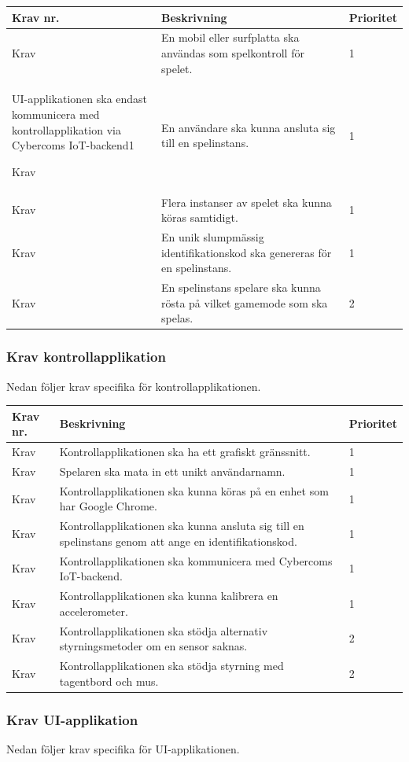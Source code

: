 \documentclass[10pt]{article}
\newcounter{indexcounter}
\newcommand{\Krav}[2]{
	\stepcounter{indexcounter}
	Krav \arabic{indexcounter} & #1 & #2 \\ \hline
}
\begin{document}
	\begin{tabular}{| p{2cm} | p{8cm} | p{2cm}|}
		\hline
		
		\textbf{Krav nr.} & \textbf{Beskrivning} &\textbf{Prioritet} \\ \hline
		\Krav{En mobil eller surfplatta ska användas som spelkontroll för spelet.}{1}
		\Krav{UI-applikationen ska endast kommunicera med \newline kontrollapplikation via  Cybercoms IoT-backend}{1}
		\Krav{En användare ska kunna ansluta sig till en spelinstans.}{1}
		\Krav{Flera instanser av spelet ska kunna köras samtidigt.}{1}
		\Krav{En unik slumpmässig identifikationskod ska genereras för en spelinstans.}{1}
		\Krav{En spelinstans spelare ska kunna rösta på vilket gamemode som ska spelas.}{2}
				
	\end{tabular}

	\subsubsection*{Krav kontrollapplikation}
	Nedan följer krav specifika för kontrollapplikationen.

	\begin{tabular}{| p{2cm} | p{8cm} | p{2cm}|}
		\hline
		
		\textbf{Krav nr.} & \textbf{Beskrivning} &\textbf{Prioritet} \\ \hline
		\Krav{Kontrollapplikationen ska ha ett grafiskt gränssnitt.}{1}
		\Krav{Spelaren ska mata in ett unikt användarnamn.}{1}
		\Krav{Kontrollapplikationen ska kunna köras på en enhet som har Google Chrome.}{1}
		\Krav{Kontrollapplikationen ska kunna ansluta sig till en spelinstans genom att ange en identifikationskod.}{1}
		\Krav{Kontrollapplikationen ska kommunicera med Cybercoms IoT-backend.}{1}
		\Krav{Kontrollapplikationen ska kunna kalibrera en accelerometer.}{1}
		\Krav{Kontrollapplikationen ska stödja alternativ styrningsmetoder om en sensor saknas.}{2}
		\Krav{Kontrollapplikationen ska stödja styrning med tagentbord och mus.}{2}

	\end{tabular}

	\subsubsection*{Krav UI-applikation}
	Nedan följer krav specifika för UI-applikationen.
\end{document}

